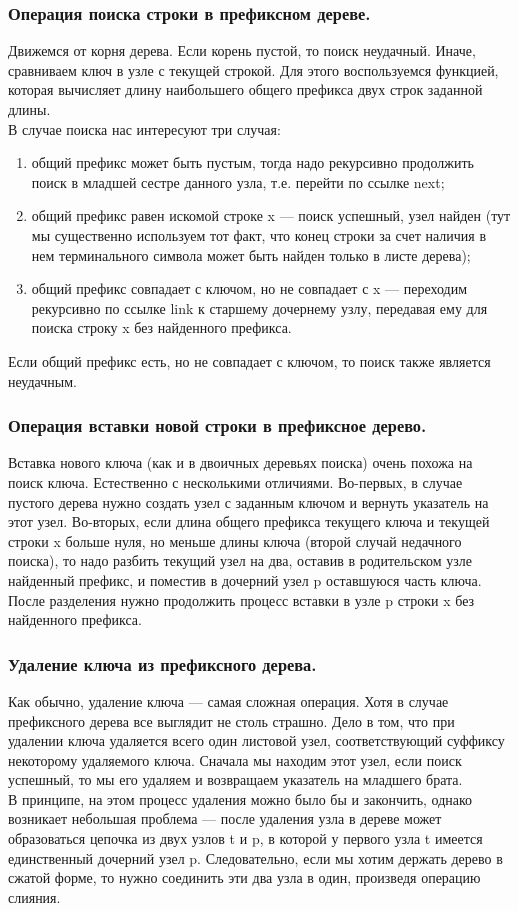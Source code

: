 \documentclass[pdf, unicode, 12pt, a4paper,oneside,fleqn]{article}
\begin{document}
\subsubsection{Операция поиска строки в префиксном дереве.}
Движемся от корня дерева. Если корень пустой, то поиск неудачный. Иначе, сравниваем ключ в узле с текущей строкой. Для этого воспользуемся функцией, которая вычисляет длину наибольшего общего префикса двух строк заданной длины.\\
В случае поиска нас интересуют три случая: 
 \begin{enumerate}
\item общий префикс может быть пустым, тогда надо рекурсивно продолжить поиск в младшей сестре данного узла, т.е. перейти по ссылке next;
\item общий префикс равен искомой строке x — поиск успешный, узел найден (тут мы существенно используем тот факт, что конец строки за счет наличия в нем терминального символа может быть найден только в листе дерева);
\item общий префикс совпадает с ключом, но не совпадает с x — переходим рекурсивно по ссылке link к старшему дочернему узлу, передавая ему для поиска строку x без найденного префикса.
\end{enumerate}
Если общий префикс есть, но не совпадает с ключом, то поиск также является неудачным.
\subsubsection{Операция вставки новой строки в префиксное дерево.}
Вставка нового ключа (как и в двоичных деревьях поиска) очень похожа на поиск ключа. Естественно с несколькими отличиями. Во-первых, в случае пустого дерева нужно создать узел с заданным ключом и вернуть указатель на этот узел. Во-вторых, если длина общего префикса текущего ключа и текущей строки x больше нуля, но меньше длины ключа (второй случай недачного поиска), то надо разбить текущий узел на два, оставив в родительском узле найденный префикс, и поместив в дочерний узел p оставшуюся часть ключа. После разделения нужно продолжить процесс вставки в узле p строки x без найденного префикса.\\
\newpage
\subsubsection{Удаление ключа из префиксного дерева.}
Как обычно, удаление ключа — самая сложная операция. Хотя в случае префиксного дерева все выглядит не столь страшно. Дело в том, что при удалении ключа удаляется всего один листовой узел, соответствующий суффиксу некоторому удаляемого ключа. Сначала мы находим этот узел, если поиск успешный, то мы его удаляем и возвращаем указатель на младшего брата. \\
В принципе, на этом процесс удаления можно было бы и закончить, однако возникает небольшая проблема — после удаления узла в дереве может образоваться цепочка из двух узлов t и p, в которой у первого узла t имеется единственный дочерний узел p. Следовательно, если мы хотим держать дерево в сжатой форме, то нужно соединить эти два узла в один, произведя операцию слияния. 
\end{document}
